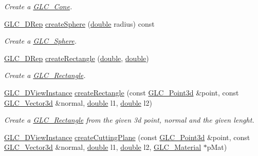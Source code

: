 \begin{DoxyCompactItemize}
\begin{DoxyCompactList}\small\item\em Create a \hyperlink{class_g_l_c___cone}{G\-L\-C\-\_\-\-Cone}. \end{DoxyCompactList}\item 
\hyperlink{class_g_l_c__3_d_rep}{G\-L\-C\-\_\-D\-Rep} \hyperlink{class_g_l_c___factory_ab7420f18574e2fc6f7d65b87ec5b22cf}{create\-Sphere} (\hyperlink{_super_l_u_support_8h_a8956b2b9f49bf918deed98379d159ca7}{double} radius) const 
\begin{DoxyCompactList}\small\item\em Create a \hyperlink{class_g_l_c___sphere}{G\-L\-C\-\_\-\-Sphere}. \end{DoxyCompactList}\item 
\hyperlink{class_g_l_c__3_d_rep}{G\-L\-C\-\_\-D\-Rep} \hyperlink{class_g_l_c___factory_a7dafb4abd1d0593d53981e97b7225f30}{create\-Rectangle} (\hyperlink{_super_l_u_support_8h_a8956b2b9f49bf918deed98379d159ca7}{double}, \hyperlink{_super_l_u_support_8h_a8956b2b9f49bf918deed98379d159ca7}{double})
\begin{DoxyCompactList}\small\item\em Create a \hyperlink{class_g_l_c___rectangle}{G\-L\-C\-\_\-\-Rectangle}. \end{DoxyCompactList}\item 
\hyperlink{class_g_l_c__3_d_view_instance}{G\-L\-C\-\_\-D\-View\-Instance} \hyperlink{class_g_l_c___factory_a34e41060d7e9bd7dec6742525408fca6}{create\-Rectangle} (const \hyperlink{glc__vector3d_8h_a4e13a9bbc7ab3d34de7e98b41836772c}{G\-L\-C\-\_\-\-Point3d} \&point, const \hyperlink{class_g_l_c___vector3d}{G\-L\-C\-\_\-\-Vector3d} \&normal, \hyperlink{_super_l_u_support_8h_a8956b2b9f49bf918deed98379d159ca7}{double} l1, \hyperlink{_super_l_u_support_8h_a8956b2b9f49bf918deed98379d159ca7}{double} l2)
\begin{DoxyCompactList}\small\item\em Create a \hyperlink{class_g_l_c___rectangle}{G\-L\-C\-\_\-\-Rectangle} from the given 3d point, normal and the given lenght. \end{DoxyCompactList}\item 
\hyperlink{class_g_l_c__3_d_view_instance}{G\-L\-C\-\_\-D\-View\-Instance} \hyperlink{class_g_l_c___factory_a75949d511eb9a8ed7ee1f94ba6f4f108}{create\-Cutting\-Plane} (const \hyperlink{glc__vector3d_8h_a4e13a9bbc7ab3d34de7e98b41836772c}{G\-L\-C\-\_\-\-Point3d} \&point, const \hyperlink{class_g_l_c___vector3d}{G\-L\-C\-\_\-\-Vector3d} \&normal, \hyperlink{_super_l_u_support_8h_a8956b2b9f49bf918deed98379d159ca7}{double} l1, \hyperlink{_super_l_u_support_8h_a8956b2b9f49bf918deed98379d159ca7}{double} l2, \hyperlink{class_g_l_c___material}{G\-L\-C\-\_\-\-Material} $\ast$p\-Mat)

\end{DoxyCompactItemize}
